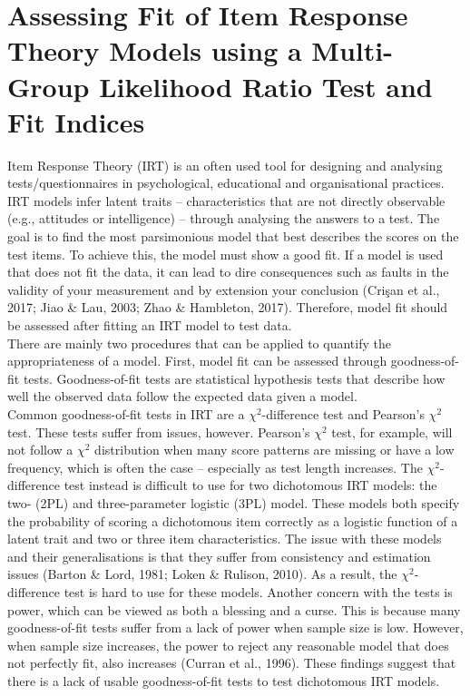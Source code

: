\documentclass[Royal,sageapa,times,doublespace]{sagej}
\begin{document}
\section{
\centering
Assessing Fit of Item Response Theory Models using a Multi-Group Likelihood Ratio Test and Fit Indices
}
Item Response Theory (IRT) is an often used tool for designing and analysing tests/questionnaires in psychological, educational and organisational practices. IRT models infer latent traits -- characteristics that are not directly observable (e.g., attitudes or intelligence) -- through analysing the answers to a test. The goal is to find the most parsimonious model that best describes the scores on the test items. To achieve this, the model must show a good fit. If a model is used that does not fit the data, it can lead to dire consequences such as faults in the validity of your measurement and by extension your conclusion (Cri\c{s}an et al., 2017; Jiao \& Lau, 2003; Zhao \& Hambleton, 2017). Therefore, model fit should be assessed after fitting an IRT model to test data. \\
\indent There are mainly two procedures that can be applied to quantify the appropriateness of a model. First, model fit can be assessed through goodness-of-fit tests. Goodness-of-fit tests are statistical hypothesis tests that describe how well the observed data follow the expected data given a model. \\
\indent Common goodness-of-fit tests in IRT are a $\chi^2$-difference test and Pearson's $\chi^2$ test. These tests suffer from issues, however. Pearson's $\chi^2$ test, for example, will not follow a $\chi^2$ distribution when many score patterns are missing or have a low frequency, which is often the case -- especially as test length increases. The $\chi^2$-difference test instead is difficult to use for two dichotomous IRT models: the two- (2PL) and three-parameter logistic (3PL) model. These models both specify the probability of scoring a dichotomous item correctly as a logistic function of a latent trait and two or three item characteristics. The issue with these models and their generalisations is that they suffer from consistency and estimation issues (Barton \& Lord, 1981; Loken \& Rulison, 2010). As a result, the $\chi^2$-difference test is hard to use for these models. Another concern with the tests is power, which can be viewed as both a blessing and a curse. This is because many goodness-of-fit tests suffer from a lack of power when sample size is low. However, when sample size increases, the power to reject any reasonable model that does not perfectly fit, also increases (Curran et al., 1996). These findings suggest that there is a lack of usable goodness-of-fit tests to test dichotomous IRT models. \\
\end{document}
